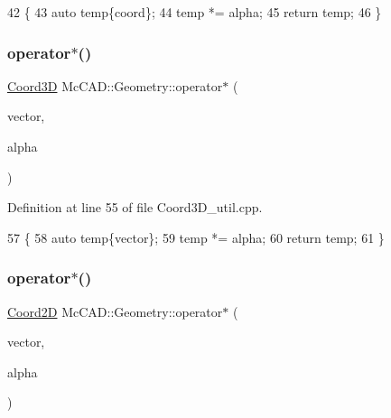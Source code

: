 \begin{DoxyCode}
42                            \{
43     \textcolor{keyword}{auto} temp\{coord\};
44     temp *= alpha;
45     \textcolor{keywordflow}{return} temp;
46 \}
\end{DoxyCode}
\mbox{\label{namespaceMcCAD_1_1Geometry_ac97a3a216d9ae16f6059efd36a713b0e}} 
\subsubsection{\texorpdfstring{operator$\ast$()}{operator*()}\hspace{0.1cm}{\footnotesize\ttfamily [4/9]}}
{\footnotesize\ttfamily \hyperlink{classMcCAD_1_1Geometry_1_1Coord3D}{Coord3D} Mc\+C\+A\+D\+::\+Geometry\+::operator$\ast$ (\begin{DoxyParamCaption}\item[{const \hyperlink{classMcCAD_1_1Geometry_1_1Coord3D}{Coord3D} \&}]{vector,  }\item[{const \hyperlink{namespaceMcCAD_1_1Geometry_ac043b37a4a7e849fca22869e1982d2f8}{coord\+\_\+type} \&}]{alpha }\end{DoxyParamCaption})}



Definition at line 55 of file Coord3\+D\+\_\+util.\+cpp.


\begin{DoxyCode}
57                                 \{
58     \textcolor{keyword}{auto} temp\{vector\};
59     temp *= alpha;
60     \textcolor{keywordflow}{return} temp;
61 \}
\end{DoxyCode}
\mbox{\label{namespaceMcCAD_1_1Geometry_a48d796599e371b20b47694baf2e9f14f}} 
\subsubsection{\texorpdfstring{operator$\ast$()}{operator*()}\hspace{0.1cm}{\footnotesize\ttfamily [5/9]}}
{\footnotesize\ttfamily \hyperlink{classMcCAD_1_1Geometry_1_1Coord2D}{Coord2D} Mc\+C\+A\+D\+::\+Geometry\+::operator$\ast$ (\begin{DoxyParamCaption}\item[{const \hyperlink{classMcCAD_1_1Geometry_1_1Coord2D}{Coord2D} \&}]{vector,  }\item[{const \hyperlink{namespaceMcCAD_1_1Geometry_ac043b37a4a7e849fca22869e1982d2f8}{coord\+\_\+type} \&}]{alpha }\end{DoxyParamCaption})}



